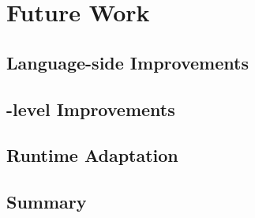 
\chapter{Future Work}
\minitoc
\introduction

\section{Language-side Improvements}

\section{\VM-level Improvements}

\section{Runtime Adaptation}

\section{Summary}

